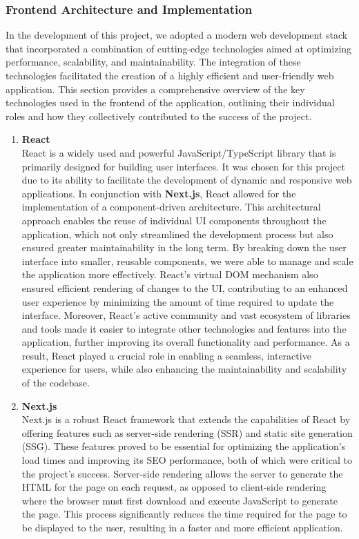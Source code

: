 \subsubsection{Frontend Architecture and Implementation}
In the development of this project, we adopted a modern web development stack that incorporated a combination of cutting-edge technologies aimed at optimizing performance, scalability, and maintainability. The integration of these technologies facilitated the creation of a highly efficient and user-friendly web application. This section provides a comprehensive overview of the key technologies used in the frontend of the application, outlining their individual roles and how they collectively contributed to the success of the project.
\begin{enumerate}
    \item \textbf{React} \\
     React is a widely used and powerful JavaScript/TypeScript library that is primarily designed for building user interfaces. It was chosen for this project due to its ability to facilitate the development of dynamic and responsive web applications. In conjunction with \textbf{Next.js}, React allowed for the implementation of a component-driven architecture. This architectural approach enables the reuse of individual UI components throughout the application, which not only streamlined the development process but also ensured greater maintainability in the long term. By breaking down the user interface into smaller, reusable components, we were able to manage and scale the application more effectively. React’s virtual DOM mechanism also ensured efficient rendering of changes to the UI, contributing to an enhanced user experience by minimizing the amount of time required to update the interface.
    \newline
    Moreover, React’s active community and vast ecosystem of libraries and tools made it easier to integrate other technologies and features into the application, further improving its overall functionality and performance. As a result, React played a crucial role in enabling a seamless, interactive experience for users, while also enhancing the maintainability and scalability of the codebase.

    \item \textbf{Next.js} \\
    Next.js is a robust React framework that extends the capabilities of React by offering features such as server-side rendering (SSR) and static site generation (SSG). These features proved to be essential for optimizing the application's load times and improving its SEO performance, both of which were critical to the project’s success. Server-side rendering allows the server to generate the HTML for the page on each request, as opposed to client-side rendering where the browser must first download and execute JavaScript to generate the page. This process significantly reduces the time required for the page to be displayed to the user, resulting in a faster and more efficient application.


\end{enumerate}
